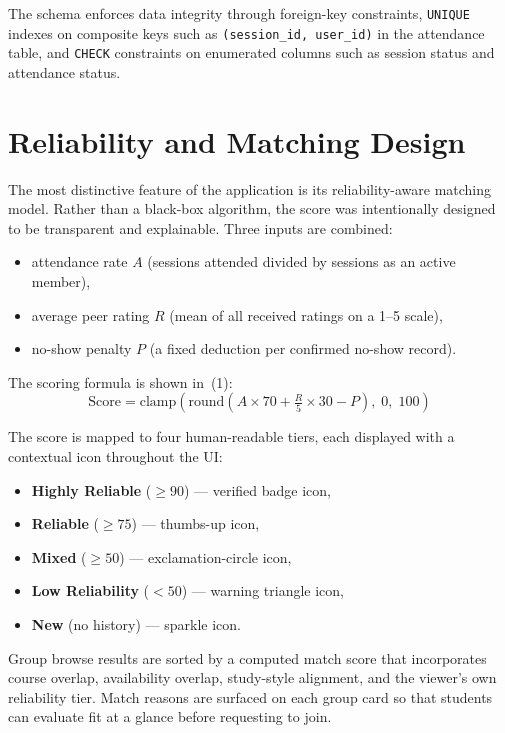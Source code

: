 \documentclass[conference]{IEEEtran}
\begin{document}
The schema enforces data integrity through foreign-key constraints, \texttt{UNIQUE} indexes on composite keys such as \texttt{(session\_id, user\_id)} in the attendance table, and \texttt{CHECK} constraints on enumerated columns such as session status and attendance status.

\section{Reliability and Matching Design}
The most distinctive feature of the application is its reliability-aware matching model. Rather than a black-box algorithm, the score was intentionally designed to be transparent and explainable. Three inputs are combined:
\begin{itemize}
    \item attendance rate $A$ (sessions attended divided by sessions as an active member),
    \item average peer rating $R$ (mean of all received ratings on a 1--5 scale),
    \item no-show penalty $P$ (a fixed deduction per confirmed no-show record).
\end{itemize}

The scoring formula is shown in~(1):
\begin{equation}
\text{Score} = \mathrm{clamp}\!\left(\mathrm{round}\!\left(A \times 70 + \tfrac{R}{5}\times 30 - P\right),\; 0,\; 100\right)
\end{equation}

The score is mapped to four human-readable tiers, each displayed with a contextual icon throughout the UI:

\begin{itemize}
    \item \textbf{Highly Reliable} ($\geq 90$) --- verified badge icon,
    \item \textbf{Reliable} ($\geq 75$) --- thumbs-up icon,
    \item \textbf{Mixed} ($\geq 50$) --- exclamation-circle icon,
    \item \textbf{Low Reliability} ($< 50$) --- warning triangle icon,
    \item \textbf{New} (no history) --- sparkle icon.
\end{itemize}

Group browse results are sorted by a computed match score that incorporates course overlap, availability overlap, study-style alignment, and the viewer's own reliability tier. Match reasons are surfaced on each group card so that students can evaluate fit at a glance before requesting to join.
\end{document}
